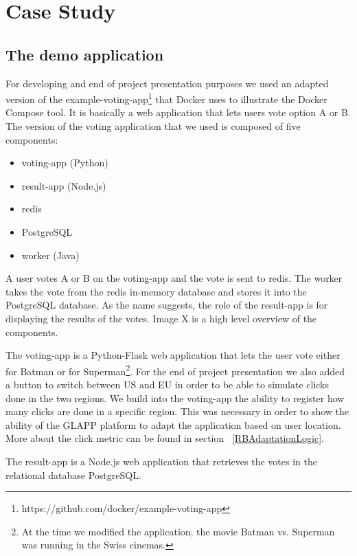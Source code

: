 \documentclass{seal_thesis}
\begin{document}
\chapter{Case Study}\label{ch:casestudy}

\section{The demo application}
For developing and end of project presentation purposes we used an adapted version of the example-voting-app\footnote{https://github.com/docker/example-voting-app} that Docker uses to illustrate the Docker Compose tool.
It is basically a web application that lets users vote option A or B.
The version of the voting application that we used is composed of five components:
\begin{itemize}
	\item voting-app (Python)
	\item result-app (Node.js)
	\item redis
	\item PostgreSQL
	\item worker (Java)
\end{itemize}
A user votes A or B on the voting-app and the vote is sent to redis.
The worker takes the vote from the redis in-memory database and stores it into the PostgreSQL database.
As the name suggests, the role of the result-app is for displaying the results of the votes.
Image X  is a high level overview of the components.

The voting-app is a Python-Flask web application that lets the user vote either for Batman or for Superman\footnote{At the time we modified the application, the movie Batman vs. Superman was running in the Swiss cinemas.}.
For the end of project presentation we also added a button to switch between US and EU in order to be able to simulate clicks done in the two regions.
We build into the voting-app the ability to register how many clicks are done in a specific region.
This was necessary in order to show the ability of the GLAPP platform to adapt the application based on user location.
More about the click metric can be found in section ~\ref{RBAdaptationLogic}.

The result-app is a Node.js web application that retrieves the votes in the relational database PostgreSQL.
\end{document}
